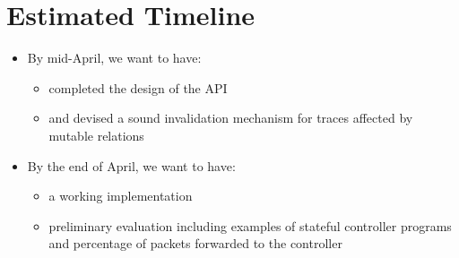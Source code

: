 \documentclass[12pt]{article}
\begin{document}
\section*{Estimated Timeline}
\begin{itemize}
\item By mid-April, we want to have:
  \begin{itemize}
  \item completed the design of the API
  \item and devised a sound invalidation mechanism for traces affected by mutable relations
  \end{itemize}
  
\item By the end of April, we want to have:
  \begin{itemize}
  \item a working implementation
  \item preliminary evaluation including examples of stateful controller programs and percentage of packets forwarded to the controller
  \end{itemize}
\end{itemize}




\end{document}
